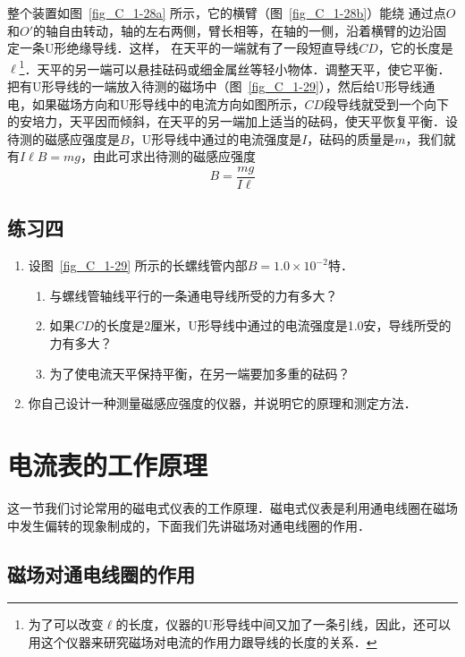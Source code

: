 整个装置如图~\ref{fig_C_1-28a} 所示，它的横臂（图~\ref{fig_C_1-28b}）能绕
通过点$O$和$O'$的轴自由转动，轴的左右两侧，臂长相等，在轴的一侧，沿着横臂的边沿固定一条U形绝缘导线．这样，
在天平的一端就有了一段短直导线$CD$，它的长度是$\ell$\footnote{为了可以改变$\ell$的长度，仪器的U形导线中间又加了一条引线，因此，还可以用这个仪器来研究磁场对电流的作用力跟导线的长度的关系．}．天平的另一端可以悬挂砝码或细金属丝等轻小物体．调整天平，使它平衡．把有U形导线的一端放入待测的磁场中（图~\ref{fig_C_1-29}），然后给U形导线通电，如果磁场方向和U形导线中的电流方向如图所示，$CD$段导线就受到一个向下的安培力，天平因而倾斜，在天平的另一端加上适当的砝码，使天平恢复平衡．设待测的磁感应强度是$B$，U形导线中通过的电流强度是$I$，砝码的质量是$m$，我们就有$I\ell B=mg$，由此可求出待测的磁感应强度
\[B=\frac{mg}{I\ell}\]


\subsection*{练习四}
\begin{enumerate}
    \item 设图~\ref{fig_C_1-29} 所示的长螺线管内部$B=1.0\times10^{-2}$特．
    \begin{enumerate}
        \item 与螺线管轴线平行的一条通电导线所受的力有多大？
        \item 如果$CD$的长度是2厘米，U形导线中通过的电流强度是1.0安，导线所受的力有多大？
        \item 为了使电流天平保持平衡，在另一端要加多重的砝码？
    \end{enumerate}
    \item 你自己设计一种测量磁感应强度的仪器，并说明它的原理和测定方法．
\end{enumerate}


\section{电流表的工作原理}
这一节我们讨论常用的磁电式仪表的工作原理．磁电式仪表是利用通电线圈在磁场中发生偏转的现象制成的，下面我们先讲磁场对通电线圈的作用．

\subsection{磁场对通电线圈的作用}

